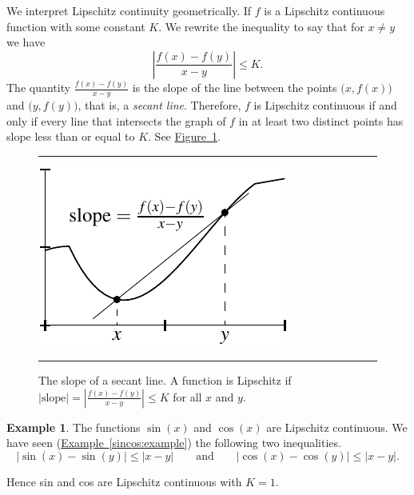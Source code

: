 \documentclass[12pt]{book}
\newenvironment{myfigureht}{%
\begin{figure}[h!t]
\noindent\rule{\textwidth}{0.4pt}\vspace{12pt}\par\centering}%
{\par\noindent\rule{\textwidth}{0.4pt}
\end{figure}}
\newcommand{\abs}[1]{\left\lvert {#1} \right\rvert}
\newcommand{\myindex}[1]{#1\index{#1}}
\theoremstyle{plain}
\theoremstyle{remark}
\theoremstyle{definition}
\theoremstyle{exercise}
\theoremstyle{example}
\newtheorem{example}[thm]{Example}
\newcommand{\figureref}[1]{\hyperref[#1]{Figure~\ref*{#1}}}
\newcommand{\exampleref}[1]{\hyperref[#1]{Example~\ref*{#1}}}
\begin{document}
We interpret Lipschitz continuity geometrically.  If $f$ is a Lipschitz
continuous function with some constant $K$.  We rewrite the inequality 
to say that for $x \not=y$ we have
\begin{equation*}
\abs{\frac{f(x)-f(y)}{x-y}} \leq K .
\end{equation*}
The quantity $\frac{f(x)-f(y)}{x-y}$ is the slope of the line
between the points $\bigl(x,f(x)\bigr)$
and $\bigl(y,f(y)\bigr)$, that is, a \emph{\myindex{secant line}}.  Therefore, $f$ is Lipschitz
continuous if and only if every line that intersects the graph of $f$ in at least two
distinct
points has slope less than or equal to $K$.  See \figureref{fig:lipschitz}.
\begin{myfigureht}
\includegraphics{figures/lipschitzfig}
\caption{The slope of a secant line.
A function is Lipschitz if $\abs{\text{slope}} =
\abs{\frac{f(x)-f(y)}{x-y}} \leq K$ for all $x$ and $y$.\label{fig:lipschitz}}
\end{myfigureht}

\begin{example}
The functions $\sin(x)$ and $\cos(x)$ are Lipschitz continuous.
We have seen (\exampleref{sincos:example}) the following two inequalities.
\begin{equation*}
\abs{\sin(x)-\sin(y)} 
\leq \abs{x-y}
\qquad \text{and} \qquad
\abs{\cos(x)-\cos(y)}
\leq \abs{x-y} .
\end{equation*}

Hence sin and cos are Lipschitz continuous with $K=1$.
\end{example}
\end{document}
